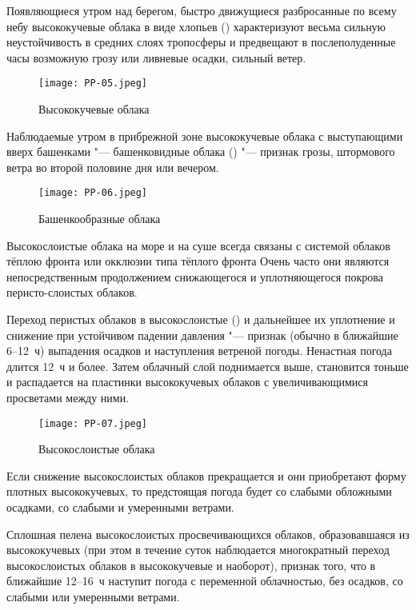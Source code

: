 Появляющиеся утром над берегом, быстро движущиеся разбросанные по
всему небу высококучевые облака в виде хлопьев () характеризуют
весьма сильную неустойчивость в средних слоях тропосферы и предвещают
в послеполуденные часы возможную грозу или ливневые осадки, сильный
ветер.

\begin{figure}[htb]
  \centering{}
  \texttt{[image: PP-05.jpeg]}
  \caption{Высококучевые облака}
  \label{fig:pp05}
  \small
  \centering{}
\end{figure}

 Наблюдаемые утром в прибрежной зоне высококучевые облака с
выступающими вверх башенками "--- башенковидные облака () "--- признак
грозы, штормового ветра во второй половине дня или вечером.

\begin{figure}[htb]
  \centering{}
  \texttt{[image: PP-06.jpeg]}
  \caption{Башенкообразные облака}
  \label{fig:pp06}
  \small
  \centering{}
\end{figure}

Высокослоистые облака на море и на суше всегда связаны с системой
облаков тёплою фронта или окклюзии типа тёплого фронта Очень часто они
являются непосредственным продолжением снижающегося и уплотняющегося
покрова перисто-слоистых облаков.

 Переход перистых облаков в высокослоистые () и
дальнейшее их уплотнение и снижение при устойчивом падении
давления "--- признак (обычно в ближайшие 6--12~ч) выпадения
осадков и наступления ветреной погоды. Ненастная погода длится 12~ч и
более. Затем облачный слой поднимается выше, становится тоньше и
распадается на пластинки высококучевых облаков с увеличивающимися
просветами между ними.

\begin{figure}[htb]
  \centering{}
  \texttt{[image: PP-07.jpeg]}
  \caption{Высокослоистые облака}
  \label{fig:pp07}
  \small
  \centering{}
\end{figure}

 Если снижение высокослоистых облаков прекращается и они
приобретают форму плотных высококучевых, то предстоящая погода будет
со слабыми обложными осадками, со слабыми и умеренными ветрами.

 Сплошная пелена высокослоистых просвечивающихся облаков,
образовавшаяся из высококучевых (при этом в течение суток наблюдается
многократный переход высокослоистых облаков в высококучевые и
наоборот), признак того, что в ближайшие 12--16~ч наступит погода
с переменной облачностью, без осадков, со слабыми или умеренными
ветрами.

